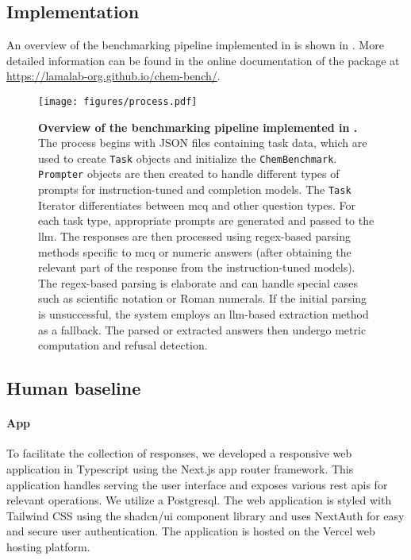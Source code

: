\subsection{Implementation}
An overview of the benchmarking pipeline implemented in \chembench is shown in . More detailed information can be found in the online documentation of the \chembench package at \url{https://lamalab-org.github.io/chem-bench/}.
\begin{figure}
    \centering
    \texttt{[image: figures/process.pdf]}
    \caption{\textbf{Overview of the benchmarking pipeline implemented in \chembench.} The process begins with JSON files containing task data, which are used to create \texttt{Task} objects and initialize the \texttt{ChemBenchmark}. \texttt{Prompter} objects are then created to handle different types of prompts for instruction-tuned and completion models.
    The \texttt{Task} Iterator differentiates between \gls{mcq} and other question types. For each task type, appropriate prompts are generated and passed to the \gls{llm}. The responses are then processed using regex-based parsing methods specific to \gls{mcq} or numeric answers (after obtaining the relevant part of the response from the instruction-tuned models).
    The regex-based parsing is elaborate and can handle special cases such as scientific notation or Roman numerals.
    If the initial parsing is unsuccessful, the system employs an \gls{llm}-based extraction method as a fallback. The parsed or extracted answers then undergo metric computation and refusal detection.}
    \label{fig:process}
\end{figure}



\clearpage
\subsection{Human baseline} \label{sec:human_baseline}
\paragraph{App} To facilitate the collection of responses, we developed a responsive web application in Typescript using the Next.js\autocite{nextjs} app router framework.
This application handles serving the user interface and exposes various \gls{rest} \glspl{api} for relevant operations.
We utilize a Postgresql.
The web application is styled with Tailwind CSS\autocite{tailwindcss} using the shadcn/ui component library and uses NextAuth\autocite{nextauth} for easy and secure user authentication.
The application is hosted on the Vercel web hosting platform.

